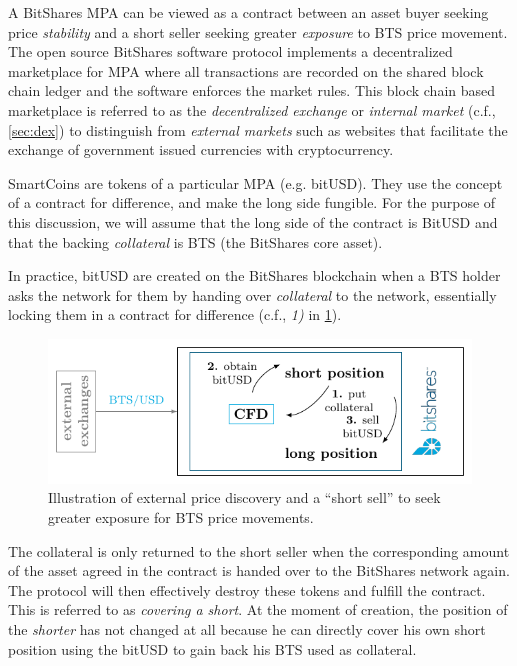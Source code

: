 \label{sec:mpa:create}

A BitShares MPA can be viewed as a contract between an asset buyer seeking
price \emph{stability} and a short seller seeking greater \emph{exposure} to
BTS price movement. The open source BitShares software protocol implements a
decentralized marketplace for MPA where all transactions are recorded on the
shared block chain ledger and the software enforces the market rules. This
block chain based marketplace is referred to as the \emph{decentralized
exchange} or \emph{internal market} (c.f., \cref{sec:dex}) to distinguish from
\emph{external markets} such as websites that facilitate the exchange of
government issued currencies with cryptocurrency.

SmartCoins are tokens of a particular MPA (e.g. bitUSD). They use the concept
of a contract for difference, and make the long side fungible. For the purpose
of this discussion, we will assume that the long side of the contract is BitUSD
and that the backing \emph{collateral} is BTS (the BitShares core asset).

In practice, bitUSD are created on the BitShares blockchain when a BTS holder
asks the network for them by handing over \emph{collateral} to the network,
essentially locking them in a contract for difference (c.f., \emph{1)} in
\cref{fig:btsdex}).

\begin{figure}[!htp]
 \begin{center}
  \includegraphics[width=.8\linewidth]{figures/external-pricefeed}
 \end{center}
 \caption{Illustration of external price discovery and a ``short sell'' to seek
          greater exposure for BTS price movements.}
 \label{fig:btsdex}
\end{figure}

The collateral is only returned to the short seller when the corresponding
amount of the asset agreed in the contract is handed over to the BitShares
network again. The protocol will then effectively destroy these tokens and
fulfill the contract. This is referred to as \emph{covering a
short}. At the moment of creation, the position of the \emph{shorter} has not
changed at all because he can directly cover his own short position using the
bitUSD to gain back his BTS used as collateral.

